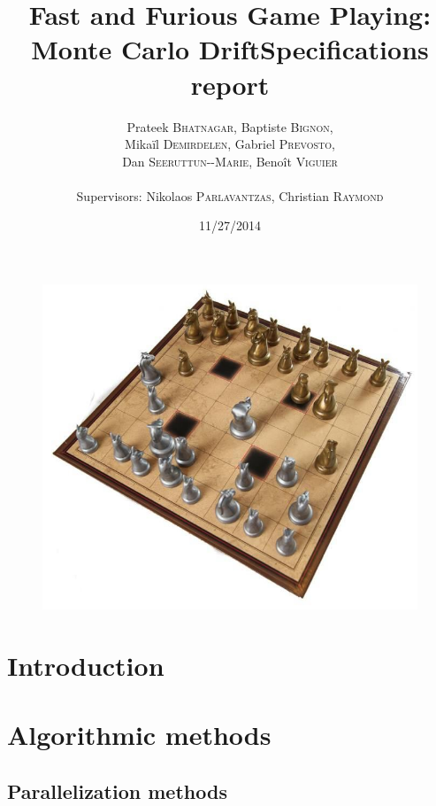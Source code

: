 \documentclass[12pt]{article}
\title{Fast and Furious Game Playing: Monte Carlo Drift\smallbreak Specifications report} %
\author{Prateek \textsc{Bhatnagar}, Baptiste \textsc{Bignon}, \\
        Mikaïl \textsc{Demirdelen}, Gabriel \textsc{Prevosto}, \\
        Dan \textsc{Seeruttun-{}-Marie}, Benoît \textsc{Viguier} \\
        \\
        Supervisors: Nikolaos \textsc{Parlavantzas}, Christian \textsc{Raymond}}
\date{11/27/2014}
\begin{document}
\maketitle

\begin{figure}[!h] 
\centerline{\includegraphics[scale=0.50]{Pictures/arimaa}}
\end{figure}
\newpage


\begin{abstract}
	
\end{abstract}
\newpage

\tableofcontents
\newpage


\section{Introduction}						\label{sec:introduction} 		
\newpage

\section{Algorithmic methods}
					\label{sec:algorithmicMethods}
	\subsection{Parallelization methods}			\label{sec:parallelization}		
\end{document}
